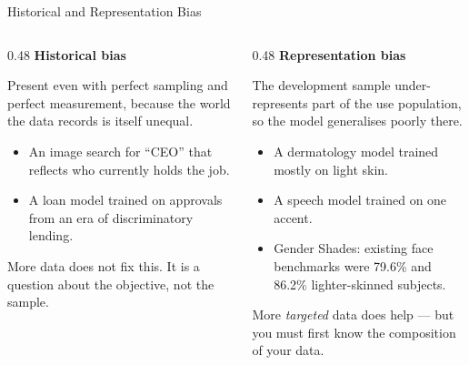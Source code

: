 
\begin{frame}{Historical and Representation Bias}

    \begin{columns}[T]
        \begin{column}{0.48\textwidth}
            \textbf{Historical bias}
            \vspace{0.3em}

            Present even with perfect sampling and perfect measurement, because the world the data
            records is itself unequal.

            \vspace{0.6em}
            \begin{itemize}\small
                \setlength\itemsep{0.35em}
                \item An image search for ``CEO'' that reflects who currently holds the job.
                \item A loan model trained on approvals from an era of discriminatory lending.
            \end{itemize}

            \vspace{0.6em}
            \begin{tcolorbox}[colback=gray!8, boxrule=0pt]
                \small More data does not fix this. It is a question about the objective, not
                the sample.
            \end{tcolorbox}
        \end{column}
        \begin{column}{0.48\textwidth}
            \textbf{Representation bias}
            \vspace{0.3em}

            The development sample under-represents part of the use population, so the model
            generalises poorly there.

            \vspace{0.6em}
            \begin{itemize}\small
                \setlength\itemsep{0.35em}
                \item A dermatology model trained mostly on light skin.
                \item A speech model trained on one accent.
                \item Gender Shades: existing face benchmarks were 79.6\% and 86.2\%
                      lighter-skinned subjects.
            \end{itemize}

            \vspace{0.6em}
            \begin{tcolorbox}[colback=gray!8, boxrule=0pt]
                \small More \emph{targeted} data does help --- but you must first know the
                composition of your data.
            \end{tcolorbox}
        \end{column}
    \end{columns}
\end{frame}
